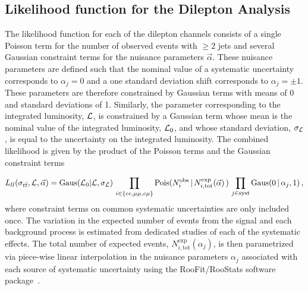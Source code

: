 \subsection{Likelihood function for the Dilepton Analysis}
\label{sec:dilep}

The likelihood function for each of the dilepton channels consists of a single Poisson term for the number of observed events with $\ge2$ jets and several Gaussian constraint terms for the nuisance parameters $\vec{\alpha}$.   
These nuisance parameters are defined such that the nominal value of a systematic uncertainty corresponds to $\alpha_j = 0$ and a one standard deviation shift corresponds to $\alpha_j = \pm 1$.
These parameters are therefore constrained by Gaussian terms with means of 0 and standard deviations of 1.
Similarly, the parameter corresponding to the integrated luminosity, ${\cal L}$, is constrained by a Gaussian term whose mean is the nominal value of the integrated luminosity, ${\cal L}_{0}$, and whose standard deviation, $\sigma_{{\cal L}}$, is equal to the uncertainty on the integrated luminosity.
The combined likelihood is given by the product of the Poisson terms and the Gaussian constraint terms

\begin{equation}\label{Eq:dileplikelihood}
  L_{ll}(\sigma_{t\bar{t}}, {\cal L}, \vec{\alpha}) = \text{Gaus}({\cal L}_0 | {\cal L}, \sigma_{\cal L})\, \prod_{i\in \{ ee,\mu\mu,e\mu\} }  \text{Pois}(N^{\text{obs}}_i \,|\, N^{\text{exp}}_{i, \text{tot}}(\vec{\alpha})\,) \,  \prod_{j\in \text{syst}} \text{Gaus}( 0 \,|\, \alpha_{j}, 1) \,,
\end{equation}
where constraint terms on common systematic uncertainties are only included once.  
The variation in the expected number of events from the signal and each background process is estimated from dedicated studies of each of the systematic effects.  
The total number of expected events, $N^{\text{exp}}_{i,\text{tot}}(\alpha_j)$, is then parametrized via piece-wise linear interpolation in the nuisance parameters $\alpha_j$ associated with each source of systematic uncertainty using the RooFit/RooStats software package~\cite{Verkerke:2003ir,Moneta:2010pm}.

